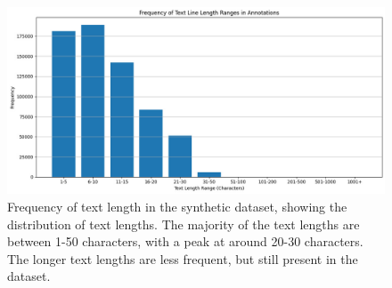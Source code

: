 \begin{figure}[ht]
    \centering
    \includegraphics[width=\textwidth]{figures/frequency_of_text_length.png}
    \caption{Frequency of text length in the synthetic dataset, 
    showing the distribution of text lengths. The majority of the text  
    lengths are between 1-50 characters, with a peak at around 20-30 characters. 
    The longer text lengths are less frequent, but still present in the dataset.}
    \label{fig:frequency_of_text_length}
\end{figure}
